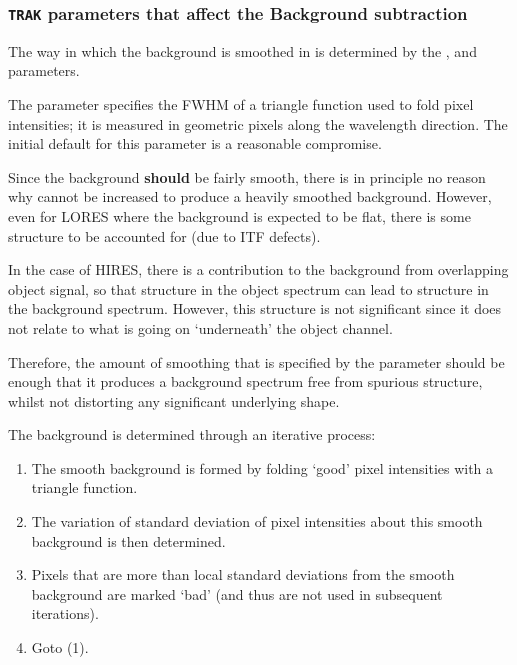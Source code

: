 \subsubsection{{\tt TRAK} parameters that affect the Background subtraction}

The way in which the background is smoothed in 
 is determined by the ,
 and  parameters.

The  parameter specifies the FWHM of a
triangle function used to
fold pixel intensities; it is measured in geometric pixels along the
wavelength direction.  The initial default for this parameter is a
reasonable compromise.

Since the background {\bf should} be fairly smooth, there is in principle no
reason why 
 cannot be increased to produce a heavily smoothed
background.  However, even for LORES where the background is expected to be
flat, there is some structure to be accounted for (due to ITF defects)\@.

In the case of HIRES, there is a contribution to the background from
overlapping object signal, so that structure in the object spectrum can
lead to structure in the background spectrum.  However, this structure is
not significant since it does not relate to what is going on `underneath' the
object channel.

Therefore, the amount of smoothing that is specified by the
parameter should be enough that it produces a background spectrum free from
spurious structure, whilst not distorting any significant underlying shape.

The background is determined through an iterative process:

\begin{enumerate}

\item The smooth background is formed by folding `good' pixel
      intensities with a triangle function.

\item The variation of standard deviation of pixel intensities about this
      smooth background is then determined.

\item Pixels that are more than  local
      standard deviations from the
      smooth background are marked `bad' (and thus are not used in subsequent
      iterations)\@.

\item Goto (1)\@.

\end{enumerate}

